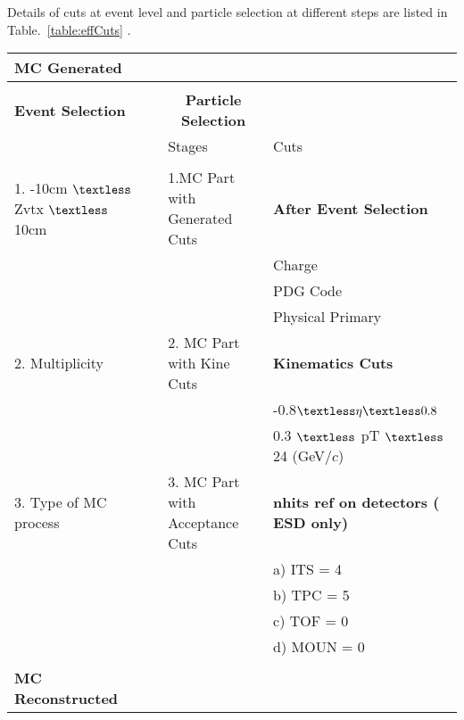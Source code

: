 \newpage
Details of cuts at event level and particle selection at different steps are listed in Table.~\ref{table:effCuts} . \\
\begin{table}[h]
\small
\centering %

\begin{tabular}{ p{4cm} c | p{5cm} |  p{5.5cm} }
 \\
  \multirow{1}{*}{\large \textbf {MC Generated }} \\
\hline
\\
  {\normalsize \textbf {Event Selection}} &&               \multicolumn{1}{c}{{\normalsize \textbf {Particle Selection}}} \\
		            &&               Stages         &              Cuts \\
\hline\hline && &\\		            	
1. -10cm $\textless$ Zvtx $\textless$ 10cm  &&               1.MC Part with Generated Cuts         &    {\textbf {After Event Selection}}\\
																		   &&&Charge\\
																		    &&& PDG Code\\
														  				  &&& Physical Primary \\


										
2. Multiplicity                     &&               2. MC Part with Kine Cuts         &              {\textbf {Kinematics Cuts }}\\
															    &&& -0.8$\textless \eta \textless  0.8$\\
															    &&& 0.3 $\textless$ pT $\textless $ 24 (GeV/$c$)\\


3. Type of MC process    &&               3. MC Part with Acceptance Cuts         &      {\textbf {nhits ref on detectors ( ESD only)}}  \\
															      &&& a) ITS = 4 \\
														 	      &&& b) TPC = 5 \\	
														                &&& c) TOF = 0\\
															       &&& d) MOUN = 0\\
&& &		\\            	


\multirow{1}{*}{\large \textbf {MC Reconstructed }} &&& \\
\hline



\end{tabular}
\end{table}
